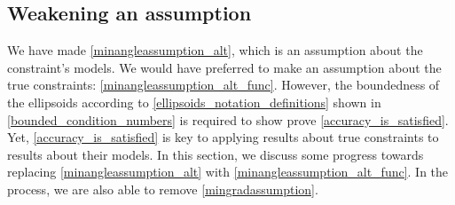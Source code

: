 
% 
% 






% 
% 
% 

\subsection{Weakening an assumption}
\label{alternative_assumptions_section}

We have made \cref{minangleassumption_alt}, which is an assumption about the constraint's models.
We would have preferred to make an assumption about the true constraints: \cref{minangleassumption_alt_func}.
However, the boundedness of the ellipsoids according to \cref{ellipsoids_notation_definitions} shown in \cref{bounded_condition_numbers}
is required to show prove \cref{accuracy_is_satisfied}.
Yet, \cref{accuracy_is_satisfied} is key to applying results about true constraints to results about their models.
In this section, we discuss some progress towards replacing \cref{minangleassumption_alt} with \cref{minangleassumption_alt_func}.
In the process, we are also able to remove \cref{mingradassumption}.

